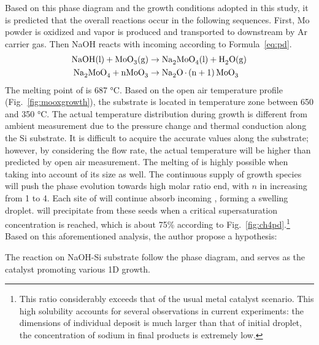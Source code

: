 Based on this phase diagram and the growth conditions adopted in this study, it is predicted that the overall reactions occur in the following sequences. First, Mo powder is oxidized and  vapor is produced and transported to downstream by Ar carrier gas. Then NaOH reacts with incoming  according to Formula~\ref{eq:pd}. 
\begin{subequations}\label{eq:pd}
\begin{align}
\cee{NaOH(l) + MoO3(g) &\rightarrow Na2MoO4(l) + H2O(g)\\
Na2MoO4 + nMoO3   &\rightarrow Na2O.(n + 1)MoO3}
\end{align}
\end{subequations}
The melting point of  is 687 \si{\degreeCelsius}. Based on the open air temperature profile (Fig.~\ref{fig:mooxgrowth}), the substrate is located in temperature zone between 650 and 350 \si{\degreeCelsius}. The actual temperature distribution during growth is different from ambient measurement due to the pressure change and thermal conduction along the Si substrate. It is difficult to acquire the accurate values along the substrate; however, by considering the flow rate, the actual temperature will be higher than predicted by open air measurement.\cite{Subannajui2010} The melting of  is highly possible when taking into account of its size as well.\cite{Bruggemann1997} The continuous supply of  growth species will push the phase evolution towards high  molar ratio end, with $n$ in  increasing from 1 to 4. Each site of  will continue absorb incoming , forming a swelling droplet.  will precipitate from these seeds when a critical supersaturation concentration is reached, which is about 75\% according to Fig.~\ref{fig:ch4pd}.\footnote{This ratio considerably exceeds that of the usual metal catalyst scenario. This high solubility accounts for several observations in current experiments: the dimensions of individual deposit is much larger than that of initial droplet, the concentration of sodium in final products is extremely low.}    Based on this aforementioned analysis, the author propose a hypothesis:
\begin{hypothesis}\label{hypo1}
The reaction on NaOH-Si substrate follow the phase diagram, and  serves as the catalyst promoting various 1D  growth. 
\end{hypothesis}

